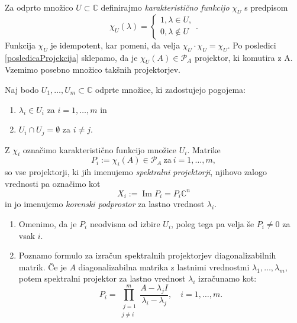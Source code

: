 \documentclass[mat1]{fmfdelo}
\newcommand{\C}{\mathbb C}
\DeclareMathOperator{\Ima}{Im}
\begin{document}
Za odprto množico $U \subset \C$ definirajmo \emph{karakteristično funkcijo} $\chi_U$ s predpisom
\begin{equation*}
    \chi_U(\lambda) =
    \begin{cases}
        1, \lambda \in U, \\
        0, \lambda \notin U
    \end{cases}.
\end{equation*}
Funkcija $\chi_U$ je idempotent, kar pomeni, da velja $\chi_U \cdot \chi_U = \chi_U$. Po posledici \ref{posledicaProjekcija} sklepamo, da je $\chi_U(A) \in \mathcal{P}_A$ projektor, ki komutira z A. Vzemimo posebno množico takšnih projektorjev.
\begin{definicija}
Naj bodo $U_1, \ldots, U_m \subset \C$ odprte množice, ki zadostujejo pogojema:
\begin{enumerate}
    \item $\lambda_i \in U_i$ za $i = 1,\ldots,m$ in
    \item $U_i \cap U_j = \emptyset$ za $i \neq j$.
\end{enumerate}
Z $\chi_i$ označimo karakteristično funkcijo množice $U_i$. Matrike
\begin{equation} \label{definicijaProjekcije}
    P_i := \chi_i(A) \in \mathcal{P}_A\ \text{za}\ i = 1,\ldots, m,
\end{equation}
so vse projektorji, ki jih imenujemo \emph{spektralni projektorji}, njihovo zalogo vrednosti pa označimo kot 
\begin{equation} \label{zalogeProjekcij}
    X_i := \Ima P_i = P_i \C^n
\end{equation}
in jo imenujemo \emph{korenski podprostor} za lastno vrednost $\lambda_i$.
\end{definicija}
\begin{opomba}
    \leavevmode
    \begin{enumerate}
        \item Omenimo, da je $P_i$ neodvisna od izbire $U_i$, poleg tega pa velja še $P_i \neq 0$ za vsak $i$.
        \item Poznamo formulo za izračun spektralnih projektorjev diagonalizabilnih matrik. Če je $A$ diagonalizabilna matrika z lastnimi vrednostmi $\lambda_1, \ldots, \lambda_m$, potem spektralni projektor za lastno vrednost $\lambda_i$ izračunamo kot:
        \begin{equation}\label{spektralniProjektorjiDiag}
            P_i = \prod_{\substack{\ j=1 \\ j \neq i}}^m \frac{A-\lambda_j I}{\lambda_i-\lambda_j}, \quad i=1, \ldots, m.
        \end{equation}
    \end{enumerate}
\end{opomba}
\end{document}
